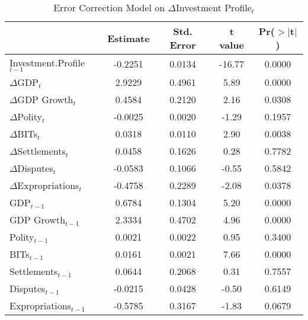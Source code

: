 \begin{table}[ht]
\centering
\label{tab:invprofile}
\caption{Error Correction Model on $\Delta$Investment Profile$_{t}$}
\begin{tabular}{lcccc}
  \hline\hline
 & Estimate & Std. Error & t value & Pr($>$$|$t$|$) \\ 
  \hline
Investment.Profile$_{t-1}$ & -0.2251 & 0.0134 & -16.77 & 0.0000 \\ 
\hline
  $\Delta$GDP$_{t}$ & 2.9229 & 0.4961 & 5.89 & 0.0000 \\ 
  $\Delta$GDP Growth$_{t}$ & 0.4584 & 0.2120 & 2.16 & 0.0308 \\ 
  $\Delta$Polity$_{t}$ & -0.0025 & 0.0020 & -1.29 & 0.1957 \\ 
  $\Delta$BITs$_{t}$ & 0.0318 & 0.0110 & 2.90 & 0.0038 \\ 
  $\Delta$Settlements$_{t}$ & 0.0458 & 0.1626 & 0.28 & 0.7782 \\ 
  $\Delta$Disputes$_{t}$ & -0.0583 & 0.1066 & -0.55 & 0.5842 \\ 
  $\Delta$Expropriations$_{t}$ & -0.4758 & 0.2289 & -2.08 & 0.0378 \\ 
  \hline
  GDP$_{t-1}$ & 0.6784 & 0.1304 & 5.20 & 0.0000 \\ 
  GDP Growth$_{t-1}$ & 2.3334 & 0.4702 & 4.96 & 0.0000 \\ 
  Polity$_{t-1}$ & 0.0021 & 0.0022 & 0.95 & 0.3400 \\ 
  BITs$_{t-1}$ & 0.0161 & 0.0021 & 7.66 & 0.0000 \\ 
  Settlements$_{t-1}$ & 0.0644 & 0.2068 & 0.31 & 0.7557 \\ 
  Disputes$_{t-1}$ & -0.0215 & 0.0428 & -0.50 & 0.6149 \\ 
  Expropriations$_{t-1}$ & -0.5785 & 0.3167 & -1.83 & 0.0679 \\ 
   \hline\hline
\end{tabular}
\end{table}


